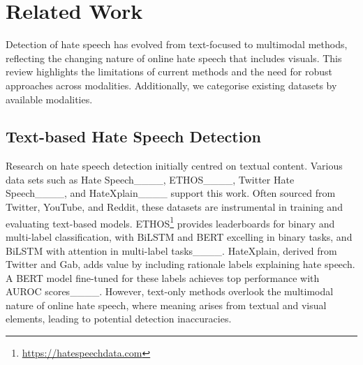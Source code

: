 \section{Related Work}
Detection of hate speech has evolved from text-focused to multimodal methods, reflecting the changing nature of online hate speech that includes visuals. This review highlights the limitations of current methods and the need for robust approaches across modalities. Additionally, we categorise existing datasets by available modalities.


\subsection{Text-based Hate Speech Detection}
Research on hate speech detection initially centred on textual content. Various data sets such as Hate Speech____, ETHOS____, Twitter Hate Speech____, and HateXplain____ support this work. Often sourced from Twitter, YouTube, and Reddit, these datasets are instrumental in training and evaluating text-based models. ETHOS\footnote{\url{https://hatespeechdata.com}} provides leaderboards for binary and multi-label classification, with BiLSTM and BERT excelling in binary tasks, and BiLSTM with attention in multi-label tasks____. HateXplain, derived from Twitter and Gab, adds value by including rationale labels explaining hate speech. A BERT model fine-tuned for these labels achieves top performance with AUROC scores____. However, text-only methods overlook the multimodal nature of online hate speech, where meaning arises from textual and visual elements, leading to potential detection inaccuracies.

